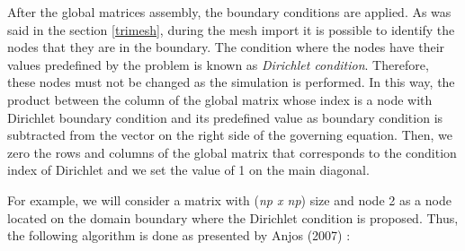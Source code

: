 After the global matrices assembly, the boundary conditions are applied. 
As was said in the section \ref{trimesh}, during the mesh import 
it is possible to identify the nodes that they are in the boundary. 
The condition where the nodes have their values predefined 
by the problem is known as \textit{Dirichlet condition}. 
Therefore, these nodes must not be changed as the simulation is 
performed. In this way, the product between the column of the 
global matrix whose index is a node with Dirichlet boundary condition 
and its predefined value as boundary condition is subtracted from 
the vector on the right side of the governing equation. 
Then, we zero the rows and columns of the global matrix that 
corresponds to the condition index of Dirichlet and we set the value 
of 1 on the main diagonal.

\medskip
For example, we will consider a matrix with (\textit{np x np}) size 
and node 2 as a node located on the domain boundary where 
the Dirichlet condition is proposed. 
Thus, the following algorithm is done as presented by Anjos (2007) 
\cite{anjos2007}:

